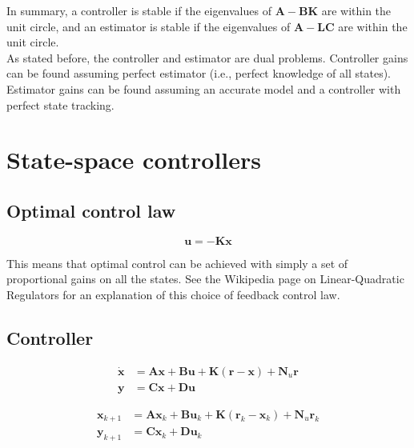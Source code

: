 \documentclass[10pt,conference,compsoc]{IEEEtran}
\newcommand{\mtx}[1] {\bm #1}
\begin{document}
In summary, a controller is stable if the eigenvalues of
$\mtx{A} - \mtx{B}\mtx{K}$ are within the unit circle, and an estimator is
stable if the eigenvalues of $\mtx{A} - \mtx{L}\mtx{C}$ are within the unit
circle. \\

As stated before, the controller and estimator are dual problems. Controller
gains can be found assuming perfect estimator (i.e., perfect knowledge of all
\glspl{state}). Estimator gains can be found assuming an accurate model and a
controller with perfect \gls{state tracking}.

\section{State-space controllers}

\subsection{Optimal control law}

\begin{equation}
  \mtx{u} = -\mtx{K}\mtx{x}
\end{equation}

This means that optimal control can be achieved with simply a set of
proportional gains on all the states. See the Wikipedia page on Linear-Quadratic Regulators \cite{bib:lqr} for an explanation of this choice of feedback control
law.

\subsection{Controller}

\begin{align}
  \dot{\mtx{x}} &= \mtx{A}\mtx{x} + \mtx{B}\mtx{u} +
    \mtx{K} (\mtx{r} - \mtx{x}) + \mtx{N}_u\mtx{r} \label{eq:s_ctrl_x} \\
  \mtx{y} &= \mtx{C}\mtx{x} + \mtx{D}\mtx{u} \label{eq:s_ctrl_y}
\end{align}

\begin{align}
  \mtx{x}_{k+1} &= \mtx{A}\mtx{x}_k + \mtx{B}\mtx{u}_k +
    \mtx{K} (\mtx{r}_k - \mtx{x}_k) \label{eq:z_ctrl_x} + \mtx{N}_u\mtx{r}_k \\
  \mtx{y}_{k+1} &= \mtx{C}\mtx{x}_k +
    \mtx{D}\mtx{u}_k \label{eq:z_ctrl_y} \\ \nonumber
\end{align}
\end{document}
